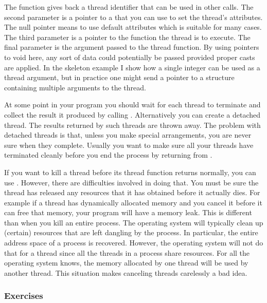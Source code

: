 The  function gives back a thread identifier that can be used in
other calls. The second parameter is a pointer to a  that you
can use to set the thread's attributes. The null pointer means to use default attributes which
is suitable for many cases. The third parameter is a pointer to the function the thread is to
execute. The final parameter is the argument passed to the thread function. By using pointers to
void here, any sort of data could potentially be passed provided proper casts are applied. In
the skeleton example I show how a single integer can be used as a thread argument, but in
practice one might send a pointer to a structure containing multiple arguments to the thread.

At some point in your program you should wait for each thread to terminate and collect the
result it produced by calling . Alternatively you can create a detached
thread. The results returned by such threads are thrown away. The problem with detached threads
is that, unless you make special arrangements, you are never sure when they complete. Usually
you want to make sure all your threads have terminated cleanly before you end the process by
returning from .

If you want to kill a thread before its thread function returns normally, you can use
. However, there are difficulties involved in doing that. You must be
sure the thread has released any resources that it has obtained before it actually dies. For
example if a thread has dynamically allocated memory and you cancel it before it can free that
memory, your program will have a memory leak. This is different than when you kill an entire
process. The operating system will typically clean up (certain) resources that are left dangling
by the process. In particular, the entire address space of a process is recovered. However, the
operating system will not do that for a thread since all the threads in a process share
resources. For all the operating system knows, the memory allocated by one thread will be used
by another thread. This situation makes canceling threads carelessly a bad idea.

%
%

\subsubsection*{Exercises}

